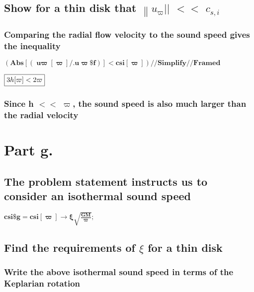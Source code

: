 \documentclass{article}
\begin{document}
\subsection*{Show for a thin disk that \(\left\|u_{\varpi }\right.\)$||$ $<<$ \(c_{s,i}\)}

\subsubsection*{Comparing the radial flow velocity to the sound speed gives the inequality}

\begin{doublespace}
\noindent\(\pmb{(\text{Abs}[(\text{u$\varpi $}[\varpi ]\text{/.}\text{u$\varpi \$$f})] < \text{csi}[\varpi ] ) \text{//}\text{Simplify} \text{//}\text{Framed}}\)
\end{doublespace}

\begin{doublespace}
\noindent\(\fbox{$3 h[\varpi ]<2 \varpi $}\)
\end{doublespace}

\subsubsection*{Since h $<<$ $\varpi $, the sound speed is also much larger than the radial velocity}

\section*{Part g.}

\subsection*{The problem statement instructs us to consider an isothermal sound speed}

\begin{doublespace}
\noindent\(\pmb{\text{csi$\$$g} = \text{csi}[\varpi ] \to  \xi \sqrt{\frac{G M}{\varpi }};}\)
\end{doublespace}

\subsection*{Find the requirements of $\xi $ for a thin disk}

\subsubsection*{Write the above isothermal sound speed in terms of the Keplarian rotation}
\end{document}
